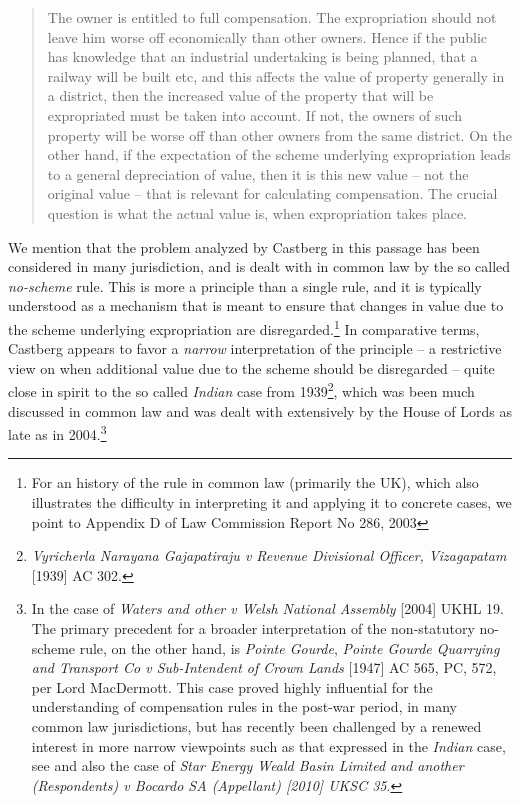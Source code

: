 \documentclass[10pt]{article} %
\begin{document}
\begin{quote}
The owner is entitled to full compensation. The expropriation should not leave him worse off economically than other owners. Hence if the public has knowledge that an industrial undertaking is being planned, that a railway will be built etc, and this affects the value of property generally in a district, then the increased value of the property that will be expropriated must be taken into account. If not, the owners of such property will be worse off than other owners from the same district. On the other hand, if the expectation of the scheme underlying expropriation leads to a general depreciation of value, then it is this new value -- not the original value -- that is relevant for calculating compensation. The crucial question is what the actual value is, when expropriation takes place.
\end{quote}

We mention that the problem analyzed by Castberg in this passage has been considered in many jurisdiction, and is dealt with in common law by the so called \emph{no-scheme} rule. This is more a principle than a single rule, and it is typically understood as a mechanism that is meant to ensure that changes in value due to the scheme underlying expropriation are disregarded.\footnote{For an history of the rule in common law (primarily the UK), which also illustrates the difficulty in interpreting it and applying it to concrete cases, we point to Appendix D of Law Commission Report No 286, 2003} In comparative terms, Castberg appears to favor a \emph{narrow} interpretation of the principle -- a restrictive view on when additional value due to the scheme should be disregarded -- quite close in spirit to the so called \emph{Indian} case from 1939\footnote{\emph{Vyricherla Narayana Gajapatiraju v Revenue Divisional
Officer, Vizagapatam} [1939] AC 302.}, which was been much discussed in common law and was dealt with extensively by the House of Lords as late as in 2004.\footnote{In the case of \emph{Waters and other v Welsh National Assembly} [2004] UKHL 19. The primary precedent for a broader interpretation of the non-statutory no-scheme rule, on the other hand, is \emph{Pointe Gourde}, \emph{Pointe Gourde Quarrying and Transport Co v Sub-Intendent of Crown Lands} [1947] AC 565, PC, 572, per Lord MacDermott. This case proved highly influential for the understanding of compensation rules in the post-war period, in many common law jurisdictions, but has recently been challenged by a renewed interest in more narrow viewpoints such as that expressed in the \emph{Indian} case, see  \cite{newuk} and also the case of \emph{Star Energy Weald Basin Limited and another (Respondents) v Bocardo SA (Appellant) [2010] UKSC 35}.}
\end{document}

